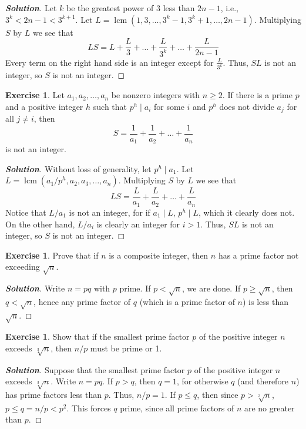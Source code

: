 \documentclass[12pt,leqno]{book}
\numberwithin{equation}{section}
\theoremstyle{definition}
\newtheorem{exer}[thm]{Exercise}
\newcommand{\lcm}{\operatorname{lcm}}
\newenvironment{Solution}{\begin{proof}[\textnormal{\textbf{Solution}}]}{\end{proof}}
\begin{document}
\begin{Solution}
 Let $k$ be the greatest power of 3 less than $2n-1$, i.e., $3^k<2n-1<3^{k+1}$. Let $L=\lcm\left(1,3,\hdots,3^k-1,3^k+1,\hdots,2n-1\right)$. Multiplying $S$ by $L$ we see that \[LS=L+\frac{L}{3}+\hdots+\frac{L}{3^k}+\hdots+\frac{L}{2n-1}\] Every term on the right hand side is an integer except for $\frac{L}{3^k}$. Thus, $SL$ is not an integer, so $S$ is not an integer.
\end{Solution}

\begin{exer}
 Let $a_1,a_2,\hdots,a_n$ be nonzero integers with $n\geq2$. If there is a prime $p$ and a positive integer $h$ such that $p^h\mid a_i$ for some $i$ and $p^h$ does not divide $a_j$ for all $j\not=i$, then \[S=\frac{1}{a_1}+\frac{1}{a_2}+\hdots+\frac{1}{a_n}\] is not an integer. 
\end{exer}

\begin{Solution}
 Without loss of generality, let $p^h\mid a_1$. Let $L=\lcm\left(a_1/p^h,a_2,a_3,\hdots,a_n\right)$. Multiplying $S$ by $L$ we see that \[LS=\frac{L}{a_1}+\frac{L}{a_2}+\hdots+\frac{L}{a_n}\] Notice that $L/a_1$ is not an integer, for if $a_1\mid L$, $p^h\mid L$, which it clearly does not. On the other hand, $L/a_i$ is clearly an integer for $i>1$. Thus, $SL$ is not an integer, so $S$ is not an integer.
\end{Solution}

\begin{exer}
 Prove that if $n$ is a composite integer, then $n$ has a prime factor not exceeding $\sqrt{n}$. 
\end{exer}

\begin{Solution}
 Write $n=pq$ with $p$ prime. If $p<\sqrt{n}$, we are done. If $p\geq\sqrt{n}$, then $q<\sqrt{n}$, hence any prime factor of $q$ (which is a prime factor of $n$) is less than $\sqrt{n}$. 
\end{Solution}

\begin{exer}
 Show that if the smallest prime factor $p$ of the positive integer $n$ exceeds $\sqrt[3]{n}$, then $n/p$ must be prime or 1.
\end{exer}

\begin{Solution}
 Suppose that the smallest prime factor $p$ of the positive integer $n$ exceeds $\sqrt[3]{n}$. Write $n=pq$. If $p>q$, then $q=1$, for otherwise $q$ (and therefore $n$) has prime factors less than $p$. Thus, $n/p=1$. If $p\leq q$, then since $p>\sqrt[3]{n}$, $p\leq q=n/p<p^2$. This forces $q$ prime, since all prime factors of $n$ are no greater than $p$.
\end{Solution}
\end{document}
